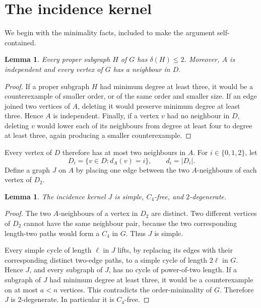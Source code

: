 \documentclass[11pt]{article}
\newtheorem{lemma}[theorem]{Lemma}
\begin{document}
\section{The incidence kernel}

We begin with the minimality facts, included to make the argument
self-contained.

\begin{lemma}\label{lem:local}
Every proper subgraph $H$ of $G$ has $\delta(H)\le2$.  Moreover, $A$ is
independent and every vertex of $G$ has a neighbour in $D$.
\end{lemma}

\begin{proof}
If a proper subgraph $H$ had minimum degree at least three, it would be a
counterexample of smaller order, or of the same order and smaller size.  If
an edge joined two vertices of $A$, deleting it would preserve minimum degree
at least three.  Hence $A$ is independent.  Finally, if a vertex $v$ had no
neighbour in $D$, deleting $v$ would lower each of its neighbours from degree
at least four to degree at least three, again producing a smaller
counterexample.
\end{proof}

Every vertex of $D$ therefore has at most two neighbours in $A$.  For
$i\in\{0,1,2\}$, let
\[
 D_i=\{v\in D:d_A(v)=i\},\qquad d_i=|D_i|.
\]
Define a graph $J$ on $A$ by placing one edge between the two $A$-neighbours
of each vertex of $D_2$.

\begin{lemma}\label{lem:kernel}
The incidence kernel $J$ is simple, $C_4$-free, and $2$-degenerate.
\end{lemma}

\begin{proof}
The two $A$-neighbours of a vertex in $D_2$ are distinct.  Two different
vertices of $D_2$ cannot have the same neighbour pair, because the two
corresponding length-two paths would form a $C_4$ in $G$.  Thus $J$ is
simple.

Every simple cycle of length $\ell$ in $J$ lifts, by replacing its edges with
their corresponding distinct two-edge paths, to a simple cycle of length
$2\ell$ in $G$.  Hence $J$, and every subgraph of $J$, has no cycle of
power-of-two length.  If a subgraph of $J$ had minimum degree at least three,
it would be a counterexample on at most $a<n$ vertices.  This contradicts
the order-minimality of $G$.  Therefore $J$ is $2$-degenerate.  In
particular it is $C_4$-free.
\end{proof}
\end{document}
